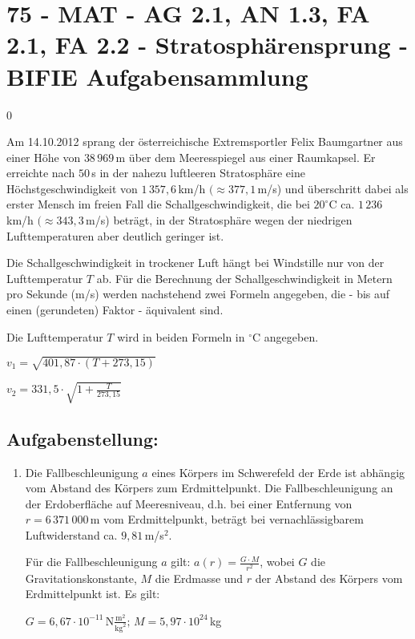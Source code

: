\section{75 - MAT - AG 2.1, AN 1.3, FA 2.1, FA 2.2 - Stratosphärensprung - BIFIE Aufgabensammlung}

\begin{langesbeispiel} \item[0] %
	
Am 14.10.2012 sprang der österreichische Extremsportler Felix Baumgartner aus einer Höhe von $38\,969$\,m über dem Meeresspiegel aus einer Raumkapsel. Er erreichte nach $50$\,s in der nahezu luftleeren Stratosphäre eine Höchstgeschwindigkeit von $1\,357,6$\,km/h $(\approx 377,1$\,m/s) und überschritt dabei als erster Mensch im freien Fall die Schallgeschwindigkeit, die bei $20^\circ$C ca. $1\,236$\,km/h $(\approx 343,3$\,m/s) beträgt, in der Stratosphäre wegen der niedrigen Lufttemperaturen aber deutlich geringer ist.\leer

Die Schallgeschwindigkeit in trockener Luft hängt bei Windstille nur von der Lufttemperatur $T$ ab. Für die Berechnung der Schallgeschwindigkeit in Metern pro Sekunde (m/s) werden nachstehend zwei Formeln angegeben, die - bis auf einen (gerundeten) Faktor - äquivalent sind.

Die Lufttemperatur $T$ wird in beiden Formeln in $^\circ$C angegeben.\leer

$v_1=\sqrt{401,87\cdot (T+273,15)}$

$v_2=331,5\cdot\sqrt{1+\frac{T}{273,15}}$

\subsection{Aufgabenstellung:}
\begin{enumerate}
	\item Die Fallbeschleunigung $a$ eines Körpers im Schwerefeld der Erde ist abhängig vom Abstand des Körpers zum Erdmittelpunkt. Die Fallbeschleunigung an der Erdoberfläche auf Meeresniveau, d.h. bei einer Entfernung von $r=6\,371\,000$\,m vom Erdmittelpunkt, beträgt bei vernachlässigbarem Luftwiderstand ca. $9,81$\,m/s$^2$.
	
	Für die Fallbeschleunigung $a$ gilt: $a(r)=\frac{G\cdot M}{r^2}$, wobei $G$ die Gravitationskonstante, $M$ die Erdmasse und $r$ der Abstand des Körpers vom Erdmittelpunkt ist. Es gilt:
	
	$G=6,67\cdot 10^{-11}\,\text{N}\frac{\text{m}^2}{\text{kg}^2}; \, M=5,97\cdot 10^{24}$\,kg
	

\end{enumerate}
\end{langesbeispiel}
